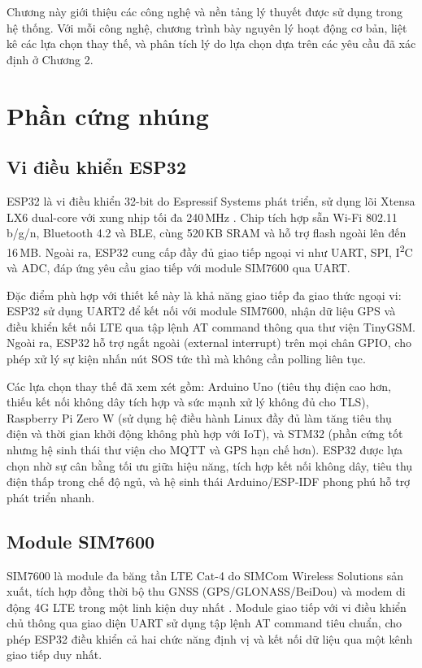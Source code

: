 \documentclass[../DoAn.tex]{subfiles}
\begin{document}
Chương này giới thiệu các công nghệ và nền tảng lý thuyết được sử dụng trong hệ thống. Với mỗi công nghệ, chương trình bày nguyên lý hoạt động cơ bản, liệt kê các lựa chọn thay thế, và phân tích lý do lựa chọn dựa trên các yêu cầu đã xác định ở Chương 2.

\section{Phần cứng nhúng}
\label{section:3.1}

\subsection{Vi điều khiển ESP32}
\label{subsection:3.1.1}

ESP32 là vi điều khiển 32-bit do Espressif Systems phát triển, sử dụng lõi Xtensa LX6 dual-core với xung nhịp tối đa 240\,MHz \cite{espressif_esp32}. Chip tích hợp sẵn Wi-Fi 802.11 b/g/n, Bluetooth 4.2 và BLE, cùng 520\,KB SRAM và hỗ trợ flash ngoài lên đến 16\,MB. Ngoài ra, ESP32 cung cấp đầy đủ giao tiếp ngoại vi như UART, SPI, I\textsuperscript{2}C và ADC, đáp ứng yêu cầu giao tiếp với module SIM7600 qua UART.

Đặc điểm phù hợp với thiết kế này là khả năng giao tiếp đa giao thức ngoại vi: ESP32 sử dụng UART2 để kết nối với module SIM7600, nhận dữ liệu GPS và điều khiển kết nối LTE qua tập lệnh AT command thông qua thư viện TinyGSM. Ngoài ra, ESP32 hỗ trợ ngắt ngoài (external interrupt) trên mọi chân GPIO, cho phép xử lý sự kiện nhấn nút SOS tức thì mà không cần polling liên tục.

Các lựa chọn thay thế đã xem xét gồm: Arduino Uno (tiêu thụ điện cao hơn, thiếu kết nối không dây tích hợp và sức mạnh xử lý không đủ cho TLS), Raspberry Pi Zero W (sử dụng hệ điều hành Linux đầy đủ làm tăng tiêu thụ điện và thời gian khởi động không phù hợp với IoT), và STM32 (phần cứng tốt nhưng hệ sinh thái thư viện cho MQTT và GPS hạn chế hơn). ESP32 được lựa chọn nhờ sự cân bằng tối ưu giữa hiệu năng, tích hợp kết nối không dây, tiêu thụ điện thấp trong chế độ ngủ, và hệ sinh thái Arduino/ESP-IDF phong phú hỗ trợ phát triển nhanh.

\subsection{Module SIM7600}
\label{subsection:3.1.2}

SIM7600 là module đa băng tần LTE Cat-4 do SIMCom Wireless Solutions sản xuất, tích hợp đồng thời bộ thu GNSS (GPS/GLONASS/BeiDou) và modem di động 4G LTE trong một linh kiện duy nhất \cite{simcom_sim7600}. Module giao tiếp với vi điều khiển chủ thông qua giao diện UART sử dụng tập lệnh AT command tiêu chuẩn, cho phép ESP32 điều khiển cả hai chức năng định vị và kết nối dữ liệu qua một kênh giao tiếp duy nhất.
\end{document}
